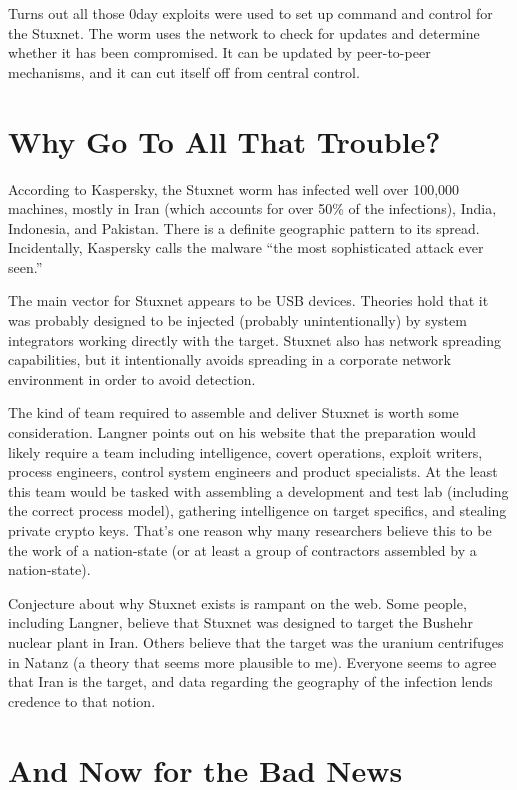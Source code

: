 \documentclass[10pt,twoside,openleft]{memoir}
\begin{document}
Turns out all those 0day exploits were used to set up command and control for the Stuxnet. The worm uses the network to check for updates and determine whether it has been compromised. It can be updated by peer-to-peer mechanisms, and it can cut itself off from central control.

\section{Why Go To All That Trouble?}

According to Kaspersky, the Stuxnet worm has infected well over 100,000 machines, mostly in Iran (which accounts for over 50\% of the infections), India, Indonesia, and Pakistan. There is a definite geographic pattern to its spread. Incidentally, Kaspersky calls the malware ``the most sophisticated attack ever seen.''

The main vector for Stuxnet appears to be USB devices. Theories hold that it was probably designed to be injected (probably unintentionally) by system integrators working directly with the target. Stuxnet also has network spreading capabilities, but it intentionally avoids spreading in a corporate network environment in order to avoid detection.

The kind of team required to assemble and deliver Stuxnet is worth some consideration. Langner points out on his website that the preparation would likely require a team including intelligence, covert operations, exploit writers, process engineers, control system engineers and product specialists. At the least this team would be tasked with assembling a development and test lab (including the correct process model), gathering intelligence on target specifics, and stealing private crypto keys. That's one reason why many researchers believe this to be the work of a nation-state (or at least a group of contractors assembled by a nation-state).

Conjecture about why Stuxnet exists is rampant on the web. Some people, including Langner, believe that Stuxnet was designed to target the Bushehr nuclear plant in Iran. Others believe that the target was the uranium centrifuges in Natanz (a theory that seems more plausible to me). Everyone seems to agree that Iran is the target, and data regarding the geography of the infection lends credence to that notion.

\section{And Now for the Bad News}
\end{document}
